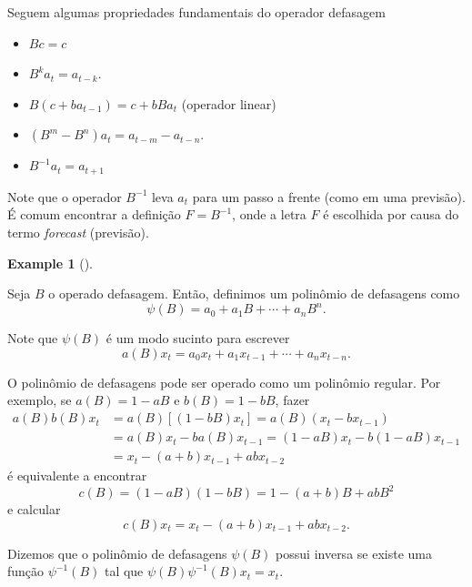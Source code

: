 \documentclass[
  letterpaper,
  DIV=11,
  numbers=noendperiod]{scrartcl}
\providecommand{\tightlist}{%
  \setlength{\itemsep}{0pt}\setlength{\parskip}{0pt}}\usepackage{longtable,booktabs,array}
\theoremstyle{plain}
\theoremstyle{plain}
\theoremstyle{definition}
\newtheorem{example}{Example}[chapter]
\theoremstyle{definition}
\theoremstyle{remark}
\begin{document}
Seguem algumas propriedades fundamentais do operador defasagem

\begin{itemize}
\tightlist
\item
  \(Bc=c\)
\item
  \(B^k a_t=a_{t-k}\).
\item
  \(B(c+ba_{t-1})=c+bBa_t\) (operador linear)
\item
  \((B^m - B^n)a_t = a_{t-m}-a_{t-n}.\)
\item
  \(B^{-1}a_t = a_{t+1}\)
\end{itemize}

Note que o operador \(B^{-1}\) leva \(a_t\) para um passo a frente (como
em uma previsão). É comum encontrar a definição \(F=B^{-1}\), onde a
letra \(F\) é escolhida por causa do termo \textit{forecast} (previsão).

\begin{example}[]\protect\hypertarget{exm-}{}\label{exm-}

Seja \(B\) o operado defasagem. Então, definimos um polinômio de
defasagens como \[\psi(B)=a_0+a_1B+\cdots+a_n B^n.\]

\end{example}

Note que \(\psi(B)\) é um modo sucinto para escrever
\[a(B)x_t=a_0x_t+a_1x_{t-1}+\cdots+a_n x_{t-n}.\]

O polinômio de defasagens pode ser operado como um polinômio regular.
Por exemplo, se \(a(B)=1-aB\) e \(b(B)=1-bB\), fazer \[\begin{align}
a(B)b(B)x_t&=a(B)[(1-bB)x_t]=a(B)(x_t-bx_{t-1})\\
&=a(B)x_t-ba(B)x_{t-1}=(1-aB)x_t-b(1-aB)x_{t-1}\\
&=x_t-(a+b)x_{t-1}+abx_{t-2}\end{align}\] é equivalente a encontrar
\[c(B)=(1-aB)(1-bB)=1-(a+b)B + abB^2\] e calcular
\[c(B)x_t=x_t-(a+b)x_{t-1}+abx_{t-2}.\]

Dizemos que o polinômio de defasagens \(\psi(B)\) possui inversa se
existe uma função \(\psi^{-1}(B)\) tal que
\(\psi(B)\psi^{-1}(B)x_t=x_t\).
\end{document}
